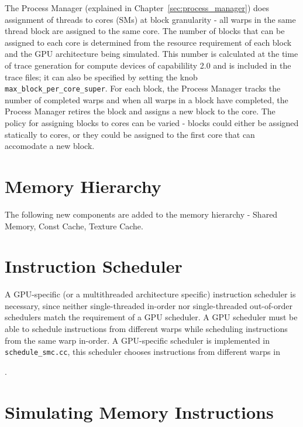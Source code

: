 The Process Manager (explained in Chapter~\ref{sec:process_manager})
does assignment of threads to cores (SMs) at block granularity - all
warps in the same thread block are assigned to the same core. The
number of blocks that can be assigned to each core is determined from
the resource requirement of each block and the GPU architecture being
simulated.  This number is calculated at the time of trace generation
for compute devices of capabilility 2.0 and is included in the trace
files; it can also be specified by setting the knob
\Verb+max_block_per_core_super+.  For each block, the Process Manager
tracks the number of completed warps and when all warps in a block
have completed, the Process Manager retires the block and assigns a
new block to the core. The policy for assigning blocks to cores can be
varied - blocks could either be assigned statically to cores, or they
could be assigned to the first core that can accomodate a new block.


\section{Memory Hierarchy}

The following new components are added to the memory hierarchy - Shared Memory,
    Const Cache, Texture Cache.

\section{Instruction Scheduler}

A GPU-specific (or a multithreaded architecture specific) instruction
scheduler is necessary, since neither single-threaded in-order nor
single-threaded out-of-order schedulers match the requirement of a GPU
scheduler. A GPU scheduler must be able to schedule instructions from
different warps while scheduling instructions from the same warp
in-order. A GPU-specific scheduler is implemented in
\Verb+schedule_smc.cc+, this scheduler chooses instructions from
different warps in .

\section{Simulating Memory Instructions}

